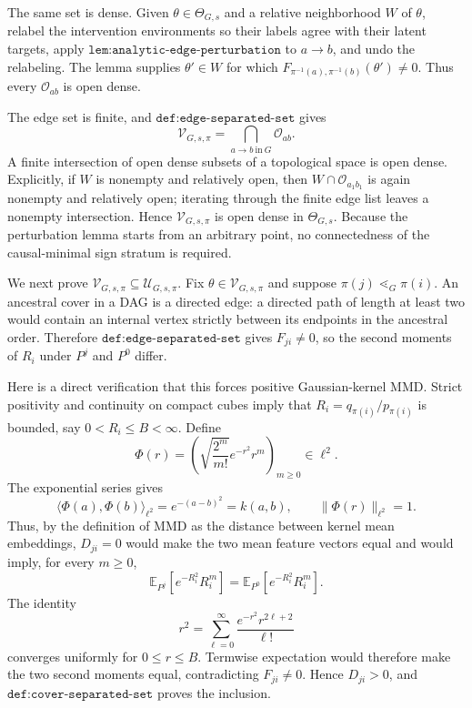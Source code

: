 The same set is dense. Given \(\theta\in\Theta_{G,s}\) and a relative neighborhood \(W\) of \(\theta\), relabel the intervention environments so their labels agree with their latent targets, apply \(\texttt{lem:analytic-edge-perturbation}\) to \(a\to b\), and undo the relabeling. The lemma supplies \(\theta'\in W\) for which \(F_{\pi^{-1}(a),\pi^{-1}(b)}(\theta')\ne0\). Thus every \(\mathcal O_{ab}\) is open dense.

The edge set is finite, and \(\texttt{def:edge-separated-set}\) gives
\[
 \mathcal V_{G,s,\pi}
 =\bigcap_{a\to b\ \mathrm{in}\ G}\mathcal O_{ab}.
\]
A finite intersection of open dense subsets of a topological space is open dense. Explicitly, if \(W\) is nonempty and relatively open, then \(W\cap\mathcal O_{a_1b_1}\) is again nonempty and relatively open; iterating through the finite edge list leaves a nonempty intersection. Hence \(\mathcal V_{G,s,\pi}\) is open dense in \(\Theta_{G,s}\). Because the perturbation lemma starts from an arbitrary point, no connectedness of the causal-minimal sign stratum is required.

We next prove \(\mathcal V_{G,s,\pi}\subseteq\mathcal U_{G,s,\pi}\). Fix \(\theta\in\mathcal V_{G,s,\pi}\) and suppose \(\pi(j)\lessdot_G\pi(i)\). An ancestral cover in a DAG is a directed edge: a directed path of length at least two would contain an internal vertex strictly between its endpoints in the ancestral order. Therefore \(\texttt{def:edge-separated-set}\) gives \(F_{ji}\ne0\), so the second moments of \(R_i\) under \(P^j\) and \(P^0\) differ.

Here is a direct verification that this forces positive Gaussian-kernel MMD. Strict positivity and continuity on compact cubes imply that \(R_i=q_{\pi(i)}/p_{\pi(i)}\) is bounded, say \(0<R_i\le B<\infty\). Define
\[
 \Phi(r)=\left(\sqrt{\frac{2^m}{m!}}e^{-r^2}r^m\right)_{m\ge0}\in\ell^2.
\]
The exponential series gives
\[
 \langle\Phi(a),\Phi(b)\rangle_{\ell^2}=e^{-(a-b)^2}=k(a,b),
 \qquad
 \|\Phi(r)\|_{\ell^2}=1.
\]
Thus, by the definition of MMD as the distance between kernel mean embeddings, \(D_{ji}=0\) would make the two mean feature vectors equal and would imply, for every \(m\ge0\),
\[
 \mathbb E_{P^j}[e^{-R_i^2}R_i^m]
 =\mathbb E_{P^0}[e^{-R_i^2}R_i^m].
\]
The identity
\[
 r^2=\sum_{\ell=0}^{\infty}\frac{e^{-r^2}r^{2\ell+2}}{\ell!}
\]
converges uniformly for \(0\le r\le B\). Termwise expectation would therefore make the two second moments equal, contradicting \(F_{ji}\ne0\). Hence \(D_{ji}>0\), and \(\texttt{def:cover-separated-set}\) proves the inclusion.

